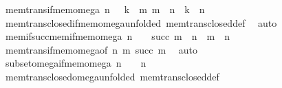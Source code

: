 \begin{isabellebody}
\endisatagproof
{\isafoldproof}%
%
\isadelimproof
\isanewline
%
\endisadelimproof
\isanewline
{}\isamarkupfalse%
\ mem{\isacharunderscore}{\kern0pt}trans{\isacharunderscore}{\kern0pt}if{\isacharunderscore}{\kern0pt}mem{\isacharunderscore}{\kern0pt}omega{\isacharcolon}{\kern0pt}\ {\isachardoublequoteopen}{\isasymlbrakk}n\ {\isasymin}\ {\isasymomega}{\isacharsemicolon}{\kern0pt}\ k\ {\isasymin}\ m{\isacharsemicolon}{\kern0pt}\ m\ {\isasymin}\ n{\isasymrbrakk}\ {\isasymLongrightarrow}\ k\ {\isasymin}\ n{\isachardoublequoteclose}\isanewline
%
\isadelimproof
\ \ %
\endisadelimproof
%
\isatagproof
{}\isamarkupfalse%
\ mem{\isacharunderscore}{\kern0pt}trans{\isacharunderscore}{\kern0pt}closed{\isacharunderscore}{\kern0pt}if{\isacharunderscore}{\kern0pt}mem{\isacharunderscore}{\kern0pt}omega{\isacharbrackleft}{\kern0pt}unfolded\ mem{\isacharunderscore}{\kern0pt}trans{\isacharunderscore}{\kern0pt}closed{\isacharunderscore}{\kern0pt}def{\isacharbrackright}{\kern0pt}\ \isamarkupfalse%
\ auto%
\endisatagproof
{\isafoldproof}%
%
\isadelimproof
\isanewline
%
\endisadelimproof
\isanewline
{}\isamarkupfalse%
\ mem{\isacharunderscore}{\kern0pt}if{\isacharunderscore}{\kern0pt}succ{\isacharunderscore}{\kern0pt}mem{\isacharunderscore}{\kern0pt}if{\isacharunderscore}{\kern0pt}mem{\isacharunderscore}{\kern0pt}omega{\isacharcolon}{\kern0pt}\ {\isachardoublequoteopen}n\ {\isasymin}\ {\isasymomega}\ {\isasymLongrightarrow}\ succ\ m\ {\isasymin}\ n\ {\isasymLongrightarrow}\ m\ {\isasymin}\ n{\isachardoublequoteclose}\isanewline
%
\isadelimproof
\ \ %
\endisadelimproof
%
\isatagproof
{}\isamarkupfalse%
\ mem{\isacharunderscore}{\kern0pt}trans{\isacharunderscore}{\kern0pt}if{\isacharunderscore}{\kern0pt}mem{\isacharunderscore}{\kern0pt}omega{\isacharbrackleft}{\kern0pt}of\ n\ m\ {\isachardoublequoteopen}succ\ m{\isachardoublequoteclose}{\isacharbrackright}{\kern0pt}\ \isamarkupfalse%
\ auto%
\endisatagproof
{\isafoldproof}%
%
\isadelimproof
\isanewline
%
\endisadelimproof
\isanewline
{}\isamarkupfalse%
\ subset{\isacharunderscore}{\kern0pt}omega{\isacharunderscore}{\kern0pt}if{\isacharunderscore}{\kern0pt}mem{\isacharunderscore}{\kern0pt}omega{\isacharcolon}{\kern0pt}\ {\isachardoublequoteopen}n\ {\isasymin}\ {\isasymomega}\ {\isasymLongrightarrow}\ n\ {\isasymsubseteq}\ {\isasymomega}{\isachardoublequoteclose}\isanewline
%
\isadelimproof
\ \ %
\endisadelimproof
%
\isatagproof
{}\isamarkupfalse%
\ mem{\isacharunderscore}{\kern0pt}trans{\isacharunderscore}{\kern0pt}closed{\isacharunderscore}{\kern0pt}omega{\isacharbrackleft}{\kern0pt}unfolded\ mem{\isacharunderscore}{\kern0pt}trans{\isacharunderscore}{\kern0pt}closed{\isacharunderscore}{\kern0pt}def{\isacharbrackright}{\kern0pt}\ \isamarkupfalse%

\end{isabellebody}
